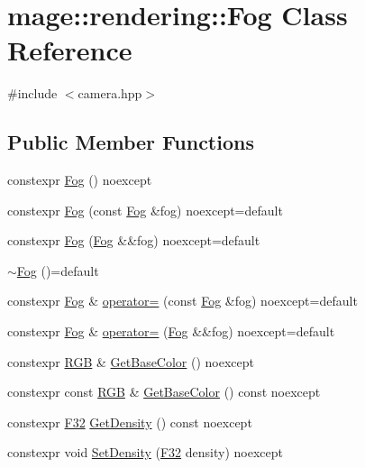 \hypertarget{classmage_1_1rendering_1_1_fog}{}\section{mage\+:\+:rendering\+:\+:Fog Class Reference}
\label{classmage_1_1rendering_1_1_fog}


{\ttfamily \#include $<$camera.\+hpp$>$}

\subsection*{Public Member Functions}
\begin{DoxyCompactItemize}
\item 
constexpr \mbox{\hyperlink{classmage_1_1rendering_1_1_fog_a48489b0ce940aff4395eb5ea88394081}{Fog}} () noexcept
\item 
constexpr \mbox{\hyperlink{classmage_1_1rendering_1_1_fog_a2f730d70ed426468f113d44e7810394b}{Fog}} (const \mbox{\hyperlink{classmage_1_1rendering_1_1_fog}{Fog}} \&fog) noexcept=default
\item 
constexpr \mbox{\hyperlink{classmage_1_1rendering_1_1_fog_aeed9b3fc18dabe37199c51ed7c4f5930}{Fog}} (\mbox{\hyperlink{classmage_1_1rendering_1_1_fog}{Fog}} \&\&fog) noexcept=default
\item 
\mbox{\hyperlink{classmage_1_1rendering_1_1_fog_a3dfb641a2c5688172e3c4be7c91631a2}{$\sim$\+Fog}} ()=default
\item 
constexpr \mbox{\hyperlink{classmage_1_1rendering_1_1_fog}{Fog}} \& \mbox{\hyperlink{classmage_1_1rendering_1_1_fog_a6197ad3df06e461c7cb2f5028f8cd901}{operator=}} (const \mbox{\hyperlink{classmage_1_1rendering_1_1_fog}{Fog}} \&fog) noexcept=default
\item 
constexpr \mbox{\hyperlink{classmage_1_1rendering_1_1_fog}{Fog}} \& \mbox{\hyperlink{classmage_1_1rendering_1_1_fog_ae0b197b983b73f78782fecfc491ddd1c}{operator=}} (\mbox{\hyperlink{classmage_1_1rendering_1_1_fog}{Fog}} \&\&fog) noexcept=default
\item 
constexpr \mbox{\hyperlink{structmage_1_1_r_g_b}{R\+GB}} \& \mbox{\hyperlink{classmage_1_1rendering_1_1_fog_af2ba57f86df0f681ad6b67cba5fc8dc1}{Get\+Base\+Color}} () noexcept
\item 
constexpr const \mbox{\hyperlink{structmage_1_1_r_g_b}{R\+GB}} \& \mbox{\hyperlink{classmage_1_1rendering_1_1_fog_a2a1441d2a0cdbc074260fa1af7fc656a}{Get\+Base\+Color}} () const noexcept
\item 
constexpr \mbox{\hyperlink{namespacemage_aa97e833b45f06d60a0a9c4fc22ae02c0}{F32}} \mbox{\hyperlink{classmage_1_1rendering_1_1_fog_ac99a5479a39027723807296c49fdfbc8}{Get\+Density}} () const noexcept
\item 
constexpr void \mbox{\hyperlink{classmage_1_1rendering_1_1_fog_a9b498c71c58e28bd58b09e4385338a13}{Set\+Density}} (\mbox{\hyperlink{namespacemage_aa97e833b45f06d60a0a9c4fc22ae02c0}{F32}} density) noexcept
\end{DoxyCompactItemize}
